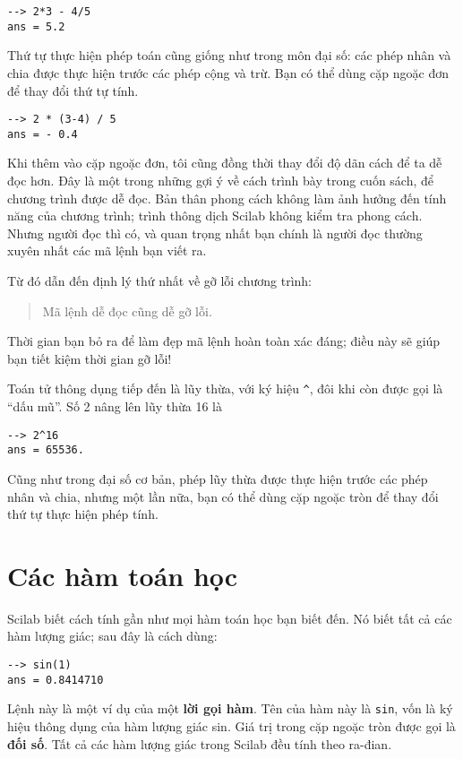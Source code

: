 \documentclass[12pt]{book}
\begin{document}
\begin{verbatim}
--> 2*3 - 4/5
ans = 5.2
\end{verbatim}

Thứ tự thực hiện phép toán cũng giống như trong môn đại số: các phép 
nhân và chia được thực hiện trước các phép cộng và trừ. Bạn có thể dùng
cặp ngoặc đơn để thay đổi thứ tự tính.

\begin{verbatim}
--> 2 * (3-4) / 5
ans = - 0.4
\end{verbatim}

Khi thêm vào cặp ngoặc đơn, tôi cũng đồng thời thay đổi độ dãn cách
để ta dễ đọc hơn. Đây là một trong những gợi ý về cách trình bày trong
cuốn sách, để chương trình được dễ đọc. Bản thân phong cách không
làm ảnh hưởng đến tính năng của chương trình; trình thông dịch Scilab
không kiểm tra phong cách. Nhưng người đọc thì có, và quan trọng nhất
bạn chính là người đọc thường xuyên nhất các mã lệnh bạn viết ra. 

Từ đó dẫn đến định lý thứ nhất về gỡ lỗi chương trình:

\begin{quote}
Mã lệnh dễ đọc cũng dễ gỡ lỗi.
\end{quote}

Thời gian bạn bỏ ra để làm đẹp mã lệnh hoàn toàn xác đáng; điều này sẽ giúp
bạn tiết kiệm thời gian gỡ lỗi!

Toán tử thông dụng tiếp đến là lũy thừa, với ký hiệu \verb+^+,
đôi khi còn được gọi là ``dấu mũ''. Số 2 nâng lên lũy thừa 16 là

\begin{verbatim}
--> 2^16
ans = 65536.
\end{verbatim}

Cũng như trong đại số cơ bản, phép lũy thừa được thực hiện trước các phép 
nhân và chia, nhưng một lần nữa, bạn có thể dùng cặp ngoặc tròn để thay
đổi thứ tự thực hiện phép tính.


\section{Các hàm toán học}

Scilab biết cách tính gần như mọi hàm toán học bạn biết đến. Nó
biết tất cả các hàm lượng giác; sau đây là cách dùng:

\begin{verbatim}
--> sin(1)
ans = 0.8414710
\end{verbatim}

Lệnh này là một ví dụ của một {\bf lời gọi hàm}. Tên của hàm này là
{\tt sin}, vốn là ký hiệu thông dụng của hàm lượng giác sin. Giá trị trong
cặp ngoặc tròn được gọi là {\bf đối số}. Tất cả các hàm lượng giác 
trong Scilab đều tính theo ra-đian.
\end{document}
